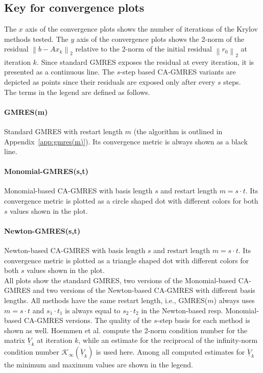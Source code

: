 \documentclass{scrartcl}
\numberwithin{equation}{section}
\newcommand{\norm}[1]{\left\lVert#1\right\rVert}
\begin{document}
\subsection{Key for convergence plots}
The $x$ axis of the convergence plots shows the number of iterations of the Krylov methods tested. The $y$ axis of the convergence plots shows the 2-norm of the residual $\norm{b - Ax_k}_2$ relative to the 2-norm of the initial residual $\norm{r_0}_2$ at iteration $k$. Since standard GMRES exposes the residual at every iteration, it is presented as a continuous line. The $s$-step based CA-GMRES variants are depicted as points since their residuals are exposed only after every $s$ steps.\\

The terms in the legend are defined as follows.
\paragraph{GMRES(m)} Standard GMRES with restart length $m$ (the algorithm is outlined in Appendix~\ref{app:gmres(m)}). Its convergence metric is always shown as a black line.

\paragraph{Monomial-GMRES(s,t)} Monomial-based CA-GMRES with basis length $s$ and restart length $m = s \cdot t$. Its convergence metric is plotted as a circle shaped dot with different colors for both $s$ values shown in the plot.

\paragraph{Newton-GMRES(s,t)} Newton-based CA-GMRES with basis length $s$ and restart length $m = s \cdot t$. Its convergence metric is plotted as a triangle shaped dot with different colors for both $s$ values shown in the plot.\\

All plots show the standard GMRES, two versions of the Monomial-based CA-GMRES and two versions of the Newton-based CA-GMRES with different basis lengths. All methods have the same restart length, i.e., GMRES($m$) always uses $m = s \cdot t$ and $s_1 \cdot t_1$ is always equal to $s_2 \cdot t_2$ in the Newton-based resp. Monomial-based CA-GMRES versions.
The quality of the $s$-step basis for each method is shown as well. Hoemmen et al. \cite{Hoemmen:2010:CKS:1970638} compute the 2-norm condition number for the matrix $\underline{V}_k$ at iteration $k$, while an estimate for the reciprocal of the infinity-norm condition number $\mathcal{K}_{\infty}(\underline{\acute{V}}_k)$ is used here. Among all computed estimates for $\underline{\acute{V}}_k$ the minimum and maximum values are shown in the legend.
\end{document}
